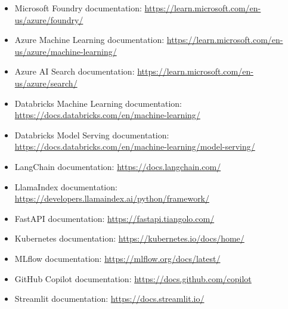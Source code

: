 \documentclass[11pt,a4paper]{article}
\begin{document}
    \begin{itemize}
        \item Microsoft Foundry documentation:
        \url{https://learn.microsoft.com/en-us/azure/foundry/}
        \item Azure Machine Learning documentation:
        \url{https://learn.microsoft.com/en-us/azure/machine-learning/}
        \item Azure AI Search documentation:
        \url{https://learn.microsoft.com/en-us/azure/search/}
        \item Databricks Machine Learning documentation:
        \url{https://docs.databricks.com/en/machine-learning/}
        \item Databricks Model Serving documentation:
        \url{https://docs.databricks.com/en/machine-learning/model-serving/}
        \item LangChain documentation:
        \url{https://docs.langchain.com/}
        \item LlamaIndex documentation:
        \url{https://developers.llamaindex.ai/python/framework/}
        \item FastAPI documentation:
        \url{https://fastapi.tiangolo.com/}
        \item Kubernetes documentation:
        \url{https://kubernetes.io/docs/home/}
        \item MLflow documentation:
        \url{https://mlflow.org/docs/latest/}
        \item GitHub Copilot documentation:
        \url{https://docs.github.com/copilot}
        \item Streamlit documentation:
        \url{https://docs.streamlit.io/}
    \end{itemize}
\end{document}
